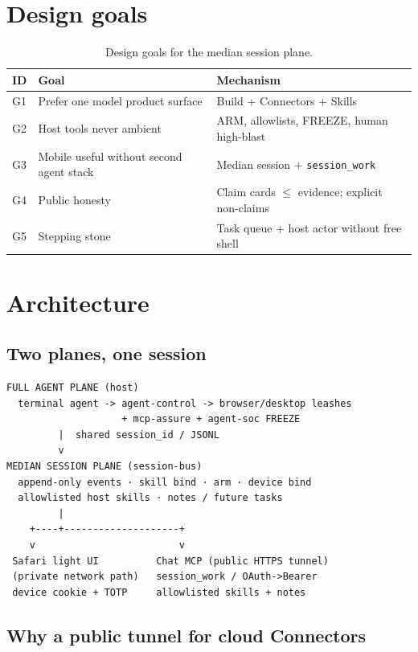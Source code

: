 \documentclass[11pt,a4paper]{article}
\begin{document}
\section{Design goals}

\begin{table}[h]
\centering
\small
\begin{tabularx}{\textwidth}{@{}lX X@{}}
\toprule
\textbf{ID} & \textbf{Goal} & \textbf{Mechanism} \\
\midrule
G1 & Prefer one model product surface & Build + Connectors + Skills \\
G2 & Host tools never ambient & ARM, allowlists, FREEZE, human high-blast \\
G3 & Mobile useful without second agent stack & Median session + \texttt{session\_work} \\
G4 & Public honesty & Claim cards $\le$ evidence; explicit non-claims \\
G5 & Stepping stone & Task queue + host actor without free shell \\
\bottomrule
\end{tabularx}
\caption{Design goals for the median session plane.}
\label{tab:goals}
\end{table}

\section{Architecture}

\subsection{Two planes, one session}

\begin{lstlisting}[basicstyle=\ttfamily\scriptsize,frame=single]
FULL AGENT PLANE (host)
  terminal agent -> agent-control -> browser/desktop leashes
                    + mcp-assure + agent-soc FREEZE
         |  shared session_id / JSONL
         v
MEDIAN SESSION PLANE (session-bus)
  append-only events · skill bind · arm · device bind
  allowlisted host skills · notes / future tasks
         |
    +----+--------------------+
    v                         v
 Safari light UI          Chat MCP (public HTTPS tunnel)
 (private network path)   session_work / OAuth->Bearer
 device cookie + TOTP     allowlisted skills + notes
\end{lstlisting}

\subsection{Why a public tunnel for cloud Connectors}
\end{document}
